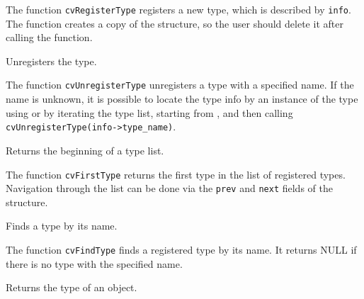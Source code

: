 The function \texttt{cvRegisterType} registers a new type, which is
described by \texttt{info}. The function creates a copy of the structure,
so the user should delete it after calling the function.

\label{UnregisterType}

Unregisters the type.


\begin{description}
\end{description}

The function \texttt{cvUnregisterType} unregisters a type with
a specified name. If the name is unknown, it is possible to locate
the type info by an instance of the type using  or by
iterating the type list, starting from , and then calling
\texttt{cvUnregisterType(info->type\_name)}.

\label{FirstType}

Returns the beginning of a type list.


The function \texttt{cvFirstType} returns the first type in the list of registered types. Navigation through the list can be done via the \texttt{prev} and \texttt{next} fields of the  structure.

\label{FindType}

Finds a type by its name.


\begin{description}
\end{description}

The function \texttt{cvFindType} finds a registered type by its name. It returns NULL if there is no type with the specified name.


\label{TypeOf}

Returns the type of an object.


